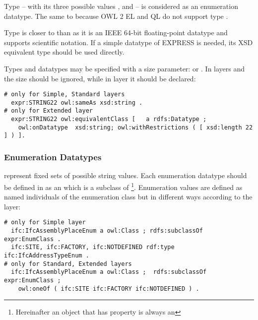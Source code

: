 Type  -- with its three possible values ,  and  -- is considered as an enumeration data\-type. The same to  because OWL 2 EL and QL do not support type  \cite{motik2012owl}.

Type  is closer to  than  as it is an IEEE 64-bit floating-point data\-type and supports scientific notation. If a simple datatype of EXPRESS is needed, its XSD equivalent type should be used directly.

Types  and  data\-types may be specified with a size parameter:  or . In layers \simple{} and \standard{} the size should be ignored, while in layer \extended{} it should be declared:

\begin{lstlisting}
# only for Simple, Standard layers
  expr:STRING22 owl:sameAs xsd:string .
# only for Extended layer
  expr:STRING22 owl:equivalentClass [   a rdfs:Datatype ;
    owl:onDatatype  xsd:string; owl:withRestrictions ( [ xsd:length 22 ] ) ].
\end{lstlisting}


\subsubsection{Enumeration Datatypes} represent fixed sets of possible string values. Each enumeration data\-type should be defined in \ifcowl{} as an  which is a subclass of \footnote{Hereinafter an object that has property  is always an }. Enumeration values are defined as named individuals of the enumeration class but in different ways according to the layer:

\begin{lstlisting}
# only for Simple layer
  ifc:IfcAssemblyPlaceEnum a owl:Class ; rdfs:subclassOf expr:EnumClass .
  ifc:SITE, ifc:FACTORY, ifc:NOTDEFINED rdf:type ifc:IfcAddressTypeEnum .
# only for Standard, Extended layers
  ifc:IfcAssemblyPlaceEnum a owl:Class ;  rdfs:subclassOf expr:EnumClass ;
    owl:oneOf ( ifc:SITE ifc:FACTORY ifc:NOTDEFINED ) .
\end{lstlisting}

